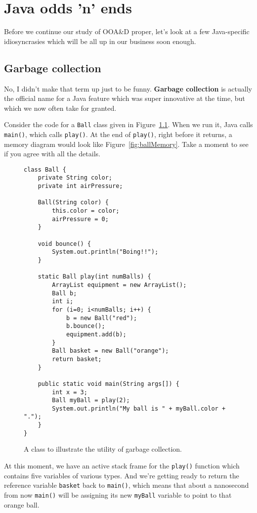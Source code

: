 
\chapter{Java odds 'n' ends}

Before we continue our study of OOA\&D proper, let's look at a few
Java-specific idiosyncrasies which will be all up in our business soon enough.

\section{Garbage collection}

No, I didn't make that term up just to be funny. \textbf{Garbage collection}
is actually the official name for a Java feature which was super innovative at
the time, but which we now often take for granted.

Consider the code for a \texttt{Ball} class given in
Figure~\ref{fig:ballCode}. When we run it, Java calls \texttt{main()}, which
calls \texttt{play()}. At the end of \texttt{play()}, right before it returns,
a memory diagram would look like Figure~\ref{fig:ballMemory}. Take a moment to
see if you agree with all the details.

\begin{figure}[ht]
\begin{Verbatim}[fontsize=\scriptsize,samepage=true,frame=single]
class Ball {
    private String color;
    private int airPressure;

    Ball(String color) {
        this.color = color;
        airPressure = 0;
    }

    void bounce() {
        System.out.println("Boing!!");
    }

    static Ball play(int numBalls) {
        ArrayList equipment = new ArrayList();
        Ball b;
        int i;
        for (i=0; i<numBalls; i++) {
            b = new Ball("red");
            b.bounce();
            equipment.add(b);
        }
        Ball basket = new Ball("orange");
        return basket;
    }

    public static void main(String args[]) {
        int x = 3;
        Ball myBall = play(2);
        System.out.println("My ball is " + myBall.color + ".");
    }
}
\end{Verbatim}
\caption{A class to illustrate the utility of garbage collection.}
\label{fig:ballCode}
\end{figure}

At this moment, we have an active stack frame for the \texttt{play()} function
which contains five variables of various types. And we're getting ready to
return the reference variable \texttt{basket} back to \texttt{main()}, which
means that about a nanosecond from now \texttt{main()} will be assigning its
new \texttt{myBall} variable to point to that orange ball.

